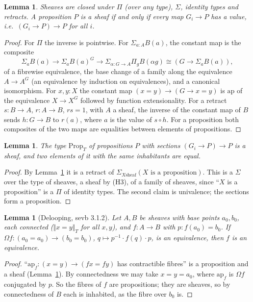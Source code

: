 \documentclass[11pt]{amsart}
\newtheorem{lemma}[theorem]{Lemma}
\theoremstyle{definition}
\theoremstyle{remark}
\newcommand{\trT}[1]{\Vert #1\Vert_T}
\begin{document}
\begin{lemma}\label{lem:closure}
Sheaves are closed under $\Pi$ (over any type), $\Sigma$, identity types and
retracts. A proposition $P$ is a sheaf if and only if every map $G_i\to P$
has a value, i.e.\ $(G_i\to P)\to P$ for all $i$.
\end{lemma}
\begin{proof}
For $\Pi$ the inverse is pointwise. For $\Sigma_{a:A}B(a)$, the constant map
is the composite
\[\textstyle\Sigma_{a}B(a)\to\Sigma_{a}B(a)^{G}\to\Sigma_{\alpha:G\to
A}\Pi_{g}B(\alpha g)\cong(G\to\Sigma_aB(a)),\]
of a fibrewise equivalence, the base change of a family along the
equivalence $A\to A^G$ (an equivalence by induction on equivalences), and a
canonical isomorphism. For $x,y:X$ the constant map $(x=y)\to(G\to x=y)$ is
$\mathrm{ap}$ of the equivalence $X\to X^G$ followed by function
extensionality. For a retract $s:B\to A$, $r:A\to B$, $rs=1$, with $A$ a sheaf, the
inverse of the constant map of $B$ sends $h:G\to B$ to $r(a)$, where $a$
is the value of $s\circ h$. For a
proposition both composites of the two maps are equalities between
elements of propositions.
\end{proof}

\begin{lemma}\label{lem:propT}
The type $\mathrm{Prop}_T$ of propositions $P$ with sections $(G_i\to P)\to
P$ is a sheaf, and two elements of it with the same inhabitants are equal.
\end{lemma}
\begin{proof}
By Lemma~\ref{lem:closure} it is a retract of $\Sigma_{X\text{
sheaf}}(X\text{ is a proposition})$. This is a $\Sigma$ over the type of
sheaves, a sheaf by (H3), of a family of sheaves, since ``$X$ is a
proposition'' is a $\Pi$ of identity types. The second claim is
univalence; the sections form a proposition.
\end{proof}

\begin{lemma}[Delooping, sevb 3.1.2]\label{lem:deloop}
Let $A,B$ be sheaves with base points $a_0,b_0$, each \emph{connected}
($\trT{x=y}$ for all $x,y$), and $f:A\to B$ with $p:f(a_0)=b_0$. If
$\Omega f:(a_0=a_0)\to(b_0=b_0)$, $q\mapsto p^{-1}\cdot f(q)\cdot p$, is an
equivalence, then $f$ is an equivalence.
\end{lemma}
\begin{proof}
``$\mathrm{ap}_f:(x=y)\to(fx=fy)$ has contractible fibres'' is a proposition
and a sheaf (Lemma~\ref{lem:closure}). By connectedness we may take
$x=y=a_0$, where $\mathrm{ap}_f$ is $\Omega f$ conjugated by $p$. So the
fibres of $f$ are propositions; they are sheaves, so by connectedness of
$B$ each is inhabited, as the fibre over $b_0$ is.
\end{proof}
\end{document}
